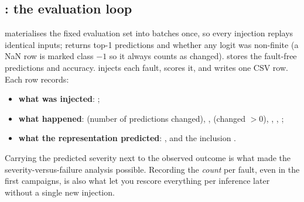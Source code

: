 \subsection{: the evaluation loop}
 materialises the fixed evaluation set into batches once, so every injection replays identical inputs;  returns top-1 predictions and whether any logit was non-finite (a NaN row is marked class $-1$ so it always counts as changed).  stores the fault-free predictions and accuracy.
 injects each fault, scores it, and writes one CSV row. Each row records:
\begin{itemize}
\item \textbf{what was injected}: ;
\item \textbf{what happened}:  (number of predictions changed), ,  (changed $>0$), , , ;
\item \textbf{what the representation predicted}: , and the inclusion .
\end{itemize}
Carrying the predicted severity next to the observed outcome is what made the severity-versus-failure analysis possible. Recording the \emph{count}  per fault, even in the first campaigns, is also what let you rescore everything per inference later without a single new injection.

